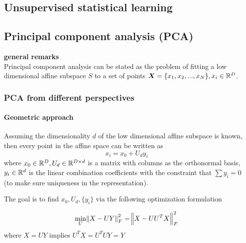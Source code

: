 \begin{refsection}
\startcontents[chapters]	
\chapter{Unsupervised statistical learning}

\section{Principal component analysis (PCA)}\label{ch:statistical-learning:sec:PCA}
\begin{mdframed}
\textbf{general remarks}\\
Principal component analysis can be stated as the problem of fitting a low dimensional affine subspace $S$ to a set of points $\bm{X}=\{x_1,x_2,...,x_N\},x_i\in \mathbb{R}^D$.\cite[19]{ma2002generalized}
\end{mdframed}

\subsection{PCA from different perspectives}
\subsubsection{Geometric approach}
\begin{mdframed}
Assuming the dimensionality $d$ of the low dimensional affine subspace is known, then every point in the affine space can be written as
$$x_i = x_0 + U_d y_i$$
where $x_0 \in \mathbb{R}^D, U_d \in \mathbb{R}^{D\times d}$ is a matrix with columns as the orthonormal basis, $y_i \in \mathbb{R}^d$ is the linear combination coefficients with the constraint that $\sum y_i = 0$ (to make sure uniqueness in the representation).

The goal is to find $x_0,U_d,\{y_i\}$ via the following optimization formulation
\end{mdframed}


\begin{definition}
$$\min_{U} \norm{X-UY}^2_F = \norm{X - UU^TX}^2_F$$
where $X = UY $ implies $U^TX = U^TUY= Y$
\end{definition}




\end{refsection}
